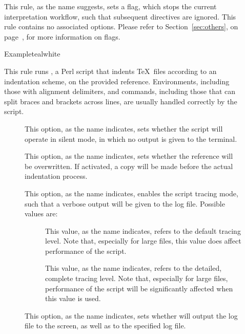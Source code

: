 \begin{description}
\item[]
This rule, as the name suggests, sets a  flag, which stops the current interpretation workflow, such that subsequent directives are ignored. This rule contains no associated options. Please refer to Section~\ref{sec:others}, on page~\pageref{sec:others}, for more information on flags.

\begin{codebox}{Example}{teal}{\icnote}{white}
\end{codebox}

\item[]
This rule runs , a Perl script that indents \TeX\ files according to an indentation scheme, on the provided  reference. Environments, including those with alignment delimiters, and commands, including those that can split braces and brackets across lines, are usually handled correctly by the script.

\begin{description}
\item[] This option, as the name indicates, sets whether the script will operate in silent mode, in which no output is given to the terminal.

\item[] This option, as the name indicates, sets whether the  reference will be overwritten. If activated, a copy will be made before the actual indentation process.

\item[] This option, as the name indicates, enables the script tracing mode, such that a verbose output will be given to the  log file. Possible values are:

\begin{description}
\item[] This value, as the name indicates, refers to the default tracing level. Note that, especially for large files, this value does affect performance of the script.

\item[] This value, as the name indicates, refers to the detailed, complete tracing level. Note that, especially for large files, performance of the script will be significantly affected when this value is used.
\end{description}

\item[] This option, as the name indicates, sets whether  will output the log file to the screen, as well as to the specified log file.


\end{description}
\end{description}

